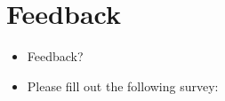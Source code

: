 \section{Feedback}
\begin{frame}
  \begin{itemize}
    \item Feedback?
    \item Please fill out the following survey:
  \end{itemize}
\end{frame}